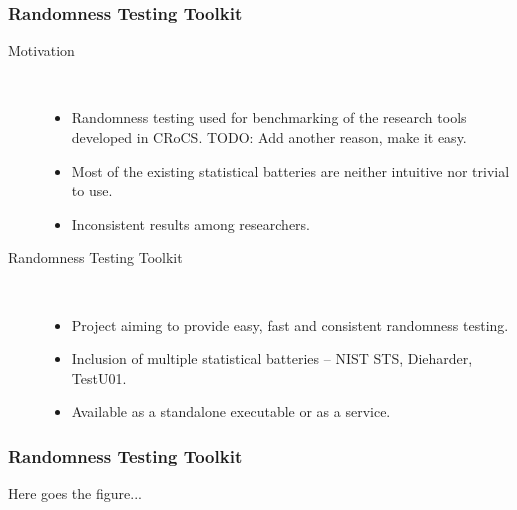 \documentclass[aspectratio=169]{beamer}
\begin{document}
\begin{frame}
\frametitle{Randomness Testing Toolkit}

\begin{description}
\item[Motivation] \hfill \\
\begin{itemize}
\item Randomness testing used for benchmarking of the research tools developed in CRoCS. TODO: Add another reason, make it easy.
\item Most of the existing statistical batteries are neither intuitive nor trivial to use.
\item Inconsistent results among researchers.
\end{itemize}

\vspace{.5cm}

\item[Randomness Testing Toolkit] \hfill \\
\begin{itemize}
\item Project aiming to provide easy, fast and consistent randomness testing.
\item Inclusion of multiple statistical batteries -- NIST STS, Dieharder, TestU01.
\item Available as a standalone executable or as a service.
\end{itemize}
\end{description}

\end{frame}

\begin{frame}
\frametitle{Randomness Testing Toolkit}

\begin{Huge}
Here goes the figure...
\end{Huge}

\end{frame}
\end{document}
